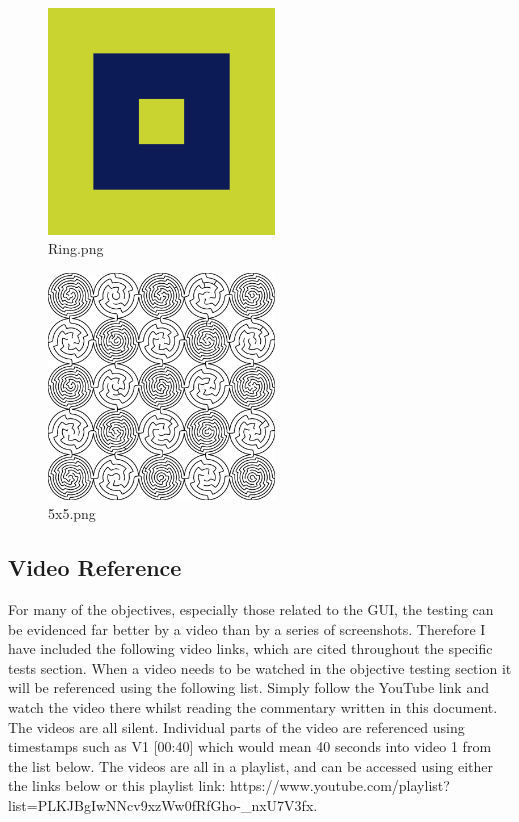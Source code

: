 \documentclass[titlepage]{article}
\begin{document}
\begin{figure}[H]
  \centering
  \includegraphics[width=6cm]{ring.png}
  \caption{Ring.png}
  \label{fig:dijk}
\end{figure}

\begin{figure}[H]
  \centering
  \includegraphics[width=6cm]{5x5.png}
  \caption{5x5.png}
  \label{fig:dijk}
\end{figure}


\subsection{Video Reference}
For many of the objectives, especially those related to the GUI, the testing can be evidenced far better by a video than by a series of screenshots. Therefore I have included the following video links, which are cited throughout the specific tests section. When a video needs to be watched in the objective testing section it will be referenced using the following list. Simply follow the YouTube link and watch the video there whilst reading the commentary written in this document. The videos are all silent. Individual parts of the video are referenced using timestamps such as V1 [00:40] which would mean 40 seconds into video 1 from the list below. The videos are all in a playlist, and can be accessed using either the links below or this playlist link: https://www.youtube.com/playlist?list=PLKJBgIwNNcv9xzWw0fRfGho-\_nxU7V3fx. 
\end{document}
